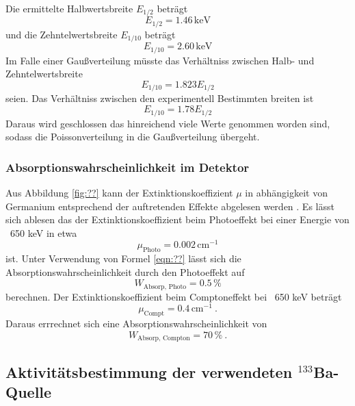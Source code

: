 Die ermittelte Halbwertsbreite $E_{1/2}$ beträgt 
\begin{equation}
  E_{1/2} = 1.46 \, \text{keV}
\end{equation}
und die Zehntelwertsbreite $E_{1/10}$ beträgt 
\begin{equation}
  E_{1/10} = 2.60 \, \text{keV}
\end{equation}
Im Falle einer Gaußverteilung müsste das Verhältniss zwischen Halb- und Zehntelwertsbreite 
\begin{equation}
  E_{1/10} = 1.823 E_{1/2}
\end{equation}
seien. Das Verhältniss zwischen den experimentell Bestimmten breiten ist
\begin{equation}
  E_{1/10} = 1.78 E_{1/2}
  \label{eqn:Ver}
\end{equation}
Daraus wird geschlossen das hinreichend viele Werte genommen worden sind, sodass die Poissonverteilung in die Gaußverteilung übergeht.

\subsubsection{Absorptionswahrscheinlichkeit im Detektor}
Aus Abbildung \ref{fig:??} kann der Extinktionskoeffizient $\mu$ in abhängigkeit von Germanium entsprechend der auftretenden Effekte abgelesen werden . Es lässt sich ablesen das der Extinktionskoeffizient beim Photoeffekt bei einer Energie von ~650 keV in etwa
\begin{equation}
  \mu_\text{Photo} = 0.002 \, \text{cm} ^{-1}
  \label{eqn:muPhoto}
\end{equation}
ist. Unter Verwendung von Formel \ref{eqn:??} lässt sich die Absorptionswahrscheinlichkeit durch den Photoeffekt auf
\begin{equation}
  W_\text{Absorp, Photo} = 0.5 \, \%
  \label{eqn:AbsorpPhoto}
\end{equation}
berechnen. Der Extinktionskoeffizient beim Comptoneffekt bei ~650 keV beträgt 
\begin{equation}
  \mu_\text{Compt} = 0.4 \, \text{cm} ^{-1} \ .
  \label{eqn:muCompt}
\end{equation}
Daraus errrechnet sich eine Absorptionswahrscheinlichkeit von
\begin{equation}
  W_\text{Absorp, Compton} = 70 \, \% \ .
  \label{eqn:AbsorpComp}
\end{equation}
\subsection{Aktivitätsbestimmung der verwendeten $^{133}$Ba-Quelle}

